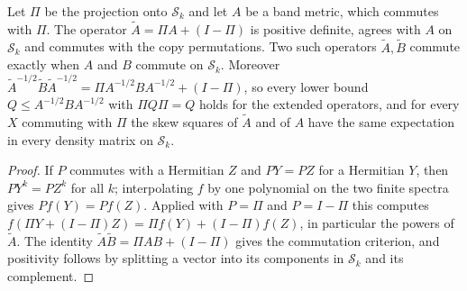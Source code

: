 \begin{lemma}\label{lem:replica_symmetric_metric}
    \leanok
    Let $\Pi$ be the projection onto $\mathcal S_k$ and let $A$ be a band metric, which
    commutes with $\Pi$. The operator $\widetilde A=\Pi A+(I-\Pi)$ is positive definite,
    agrees with $A$ on $\mathcal S_k$ and commutes with the copy permutations. Two such
    operators $\widetilde A,\widetilde B$ commute exactly when $A$ and $B$ commute on
    $\mathcal S_k$. Moreover
    $\widetilde A^{-1/2}\widetilde B\widetilde A^{-1/2}=\Pi A^{-1/2}BA^{-1/2}+(I-\Pi)$, so
    every lower bound $Q\le A^{-1/2}BA^{-1/2}$ with $\Pi Q\Pi=Q$ holds for the extended
    operators, and for every $X$ commuting with $\Pi$ the skew squares of $\widetilde A$ and
    of $A$ have the same expectation in every density matrix on $\mathcal S_k$.
\end{lemma}

\begin{proof}\leanok
    If $P$ commutes with a Hermitian $Z$ and $PY=PZ$ for a Hermitian $Y$, then $PY^k=PZ^k$
    for all $k$; interpolating $f$ by one polynomial on the two finite spectra gives
    $Pf(Y)=Pf(Z)$. Applied with $P=\Pi$ and $P=I-\Pi$ this computes
    $f(\Pi Y+(I-\Pi)Z)=\Pi f(Y)+(I-\Pi)f(Z)$, in particular the powers of $\widetilde A$.
    The identity $\widetilde A\widetilde B=\Pi AB+(I-\Pi)$ gives the commutation criterion,
    and positivity follows by splitting a vector into its components in $\mathcal S_k$ and
    its complement.
\end{proof}

